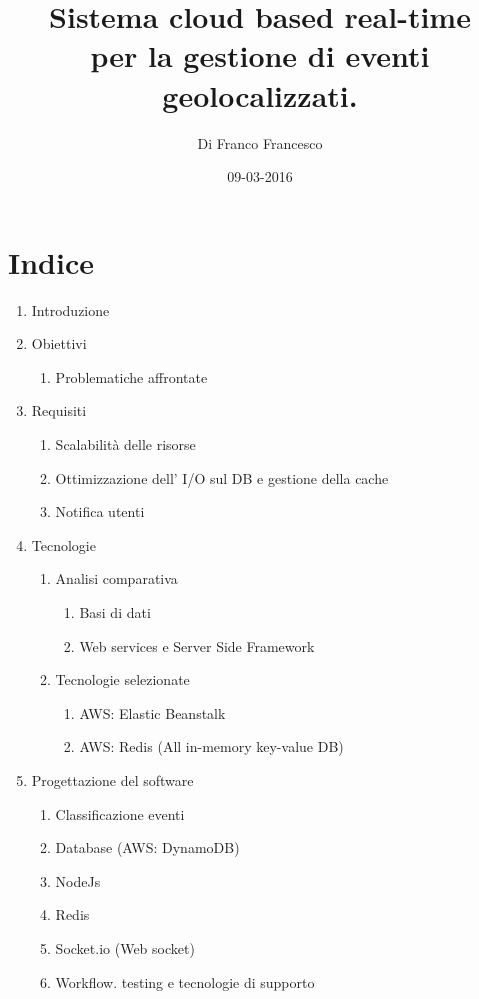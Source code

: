 \documentclass[a4paper, 11pt]{report}
\title{Sistema cloud based real-time \\per la gestione di eventi geolocalizzati.}
\author{Di Franco Francesco}
\date{09-03-2016}
\begin{document}






\chapter*{Indice}


\large
\begin{enumerate}[label*=\arabic*.]
\item Introduzione %

\item Obiettivi %
\begin{enumerate}[label*=\arabic*.]
	\item Problematiche affrontate %
	
\end{enumerate}

\item Requisiti %
\begin{enumerate}[label*=\arabic*.]
	\item Scalabilit\`a delle risorse %
	\item Ottimizzazione dell' I/O sul DB e gestione della cache %
	\item Notifica utenti %
\end{enumerate}

\item Tecnologie %
\begin{enumerate}[label*=\arabic*.]
	\item Analisi comparativa %
	\begin{enumerate}[label*=\arabic*.]
		\item Basi di dati %
		\item Web services e Server Side Framework %
	\end{enumerate}

	\item Tecnologie selezionate %
	\begin{enumerate}[label*=\arabic*.]
		\item AWS: Elastic Beanstalk %
		\item AWS: Redis  (All in-memory key-value DB)%
	\end{enumerate}
\end{enumerate}

\item Progettazione del software %
\begin{enumerate}[label*=\arabic*.]
	\item Classificazione eventi %
	\item Database (AWS: DynamoDB)
	\item NodeJs 
	\item Redis
	\item Socket.io (Web socket)
	\item Workflow. testing e tecnologie di supporto
\end{enumerate}


\end{enumerate}
\end{document}
